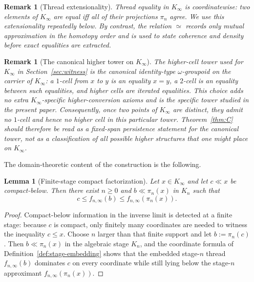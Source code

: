 \documentclass[webpdf,traditional,large,numbered]{oup-authoring-template}
\theoremstyle{thmstyleone}%
\newtheorem{lemma}[theorem]{Lemma}
\theoremstyle{thmstyletwo}%
\newtheorem{remark}[theorem]{Remark}
\theoremstyle{thmstylethree}%
\newcommand{\Kinf}{K_\infty}
\begin{document}
\begin{remark}[Thread extensionality]\label{rem:thread-extensionality}
Thread equality in $\Kinf$ is coordinatewise: two elements of $\Kinf$ are equal
iff all of their projections $\pi_n$ agree.  We use this extensionality
repeatedly below.  By contrast, the relation $\simeq$ records only mutual
approximation in the homotopy order and is used to state coherence and density
before exact equalities are extracted.
\end{remark}

\begin{remark}[The canonical higher tower on $\Kinf$]\label{rem:kinfty-canonical-tower}
The higher-cell tower used for $\Kinf$ in Section~\ref{sec:witness} is the
canonical identity-type $\omega$-groupoid on the carrier of $\Kinf$: a $1$-cell
from $x$ to $y$ is an equality $x=y$, a $2$-cell is an equality between such
equalities, and higher cells are iterated equalities.  This choice adds no
extra $\Kinf$-specific higher-conversion axioms and is the specific tower
studied in the present paper.  Consequently, once two points of $\Kinf$ are
distinct, they admit no $1$-cell and hence no higher cell in this particular
tower.  Theorem~\ref{thm:C} should therefore be read as a fixed-span
persistence statement for the canonical tower, not as a classification of all
possible higher structures that one might place on $\Kinf$.
\end{remark}

The domain-theoretic content of the construction is the following.

\begin{lemma}[Finite-stage compact factorization]\label{lem:compact-factor}
  Let $x\in\Kinf$ and let $c\ll x$ be compact-below.  Then there exist
  $n\ge 0$ and $b\ll \pi_n(x)$ in $K_n$ such that
  \[
    c\le f_{n,\infty}(b)\le f_{n,\infty}(\pi_n(x)).
  \]
\end{lemma}

\begin{proof}
  Compact-below information in the inverse limit is detected at a finite stage:
  because $c$ is compact, only finitely many coordinates are needed to witness
  the inequality $c\le x$.  Choose $n$ larger than that finite support and let
  $b:=\pi_n(c)$.  Then $b\ll \pi_n(x)$ in the algebraic stage $K_n$, and the
  coordinate formula of Definition~\ref{def:stage-embedding} shows that the
  embedded stage-$n$ thread $f_{n,\infty}(b)$ dominates $c$ on every
  coordinate while still lying below the stage-$n$ approximant
  $f_{n,\infty}(\pi_n(x))$.
\end{proof}
\end{document}
